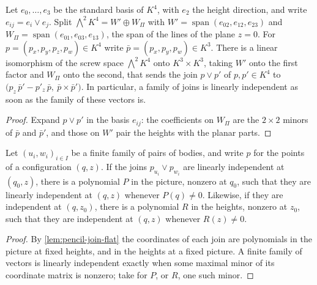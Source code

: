 \begin{lemma}
  \label{lem:pencil-join-flat}
  \leanok
  Let $e_0, \dots, e_3$ be the standard basis of $K^4$, with $e_2$ the
  height direction, and write $e_{ij} = e_i \vee e_j$. Split
  $\bigwedge^2 K^4 = W' \oplus W_\Pi$ with
  $W' = \operatorname{span}(e_{02}, e_{12}, e_{23})$ and
  $W_\Pi = \operatorname{span}(e_{01}, e_{03}, e_{13})$, the span of the
  lines of the plane $z = 0$. For $p = (p_x, p_y, p_z, p_w) \in K^4$ write
  $\bar p = (p_x, p_y, p_w) \in K^3$. There is a linear isomorphism of
  the screw space $\bigwedge^2 K^4$ onto $K^3 \times K^3$, taking $W'$ onto
  the first factor and $W_\Pi$ onto the second, that sends the join
  $p \vee p'$ of $p, p' \in K^4$ to
  $\bigl(p_z\,\bar p' - p'_z\,\bar p,\ \bar p \times \bar p'\bigr)$. In
  particular, a family of joins is linearly independent as soon as the
  family of these vectors is.
\end{lemma}
\begin{proof}
  \leanok
  Expand $p \vee p'$ in the basis $e_{ij}$: the coefficients on $W_\Pi$
  are the $2 \times 2$ minors of $\bar p$ and $\bar p'$, and those on
  $W'$ pair the heights with the planar parts.
\end{proof}

\begin{lemma}
  \label{lem:pencil-join-independence-open}
  \leanok
  Let $(u_i, w_i)_{i \in I}$ be a finite family of pairs of bodies, and
  write $p$ for the points of a configuration $(q, z)$. If the joins
  $p_{u_i} \vee p_{w_i}$ are linearly independent at $(q_0, z)$, there
  is a polynomial $P$ in the picture, nonzero at $q_0$, such that they
  are linearly independent at $(q, z)$ whenever $P(q) \neq 0$. Likewise,
  if they are independent at $(q, z_0)$, there is a polynomial $R$ in the
  heights, nonzero at $z_0$, such that they are independent at $(q, z)$
  whenever $R(z) \neq 0$.
\end{lemma}
\begin{proof}
  \leanok
  By \cref{lem:pencil-join-flat} the coordinates of each join are
  polynomials in the picture at fixed heights, and in the heights at a
  fixed picture. A finite family of vectors is linearly independent
  exactly when some maximal minor of its coordinate matrix is nonzero;
  take for $P$, or $R$, one such minor.
\end{proof}


